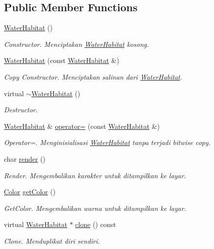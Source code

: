 \subsection*{Public Member Functions}
\begin{DoxyCompactItemize}
\item 
\hyperlink{classWaterHabitat_a57a0d15fae5e17531835be2284df0fd1}{Water\+Habitat} ()
\begin{DoxyCompactList}\small\item\em Constructor. Menciptakan \hyperlink{classWaterHabitat}{Water\+Habitat} kosong. \end{DoxyCompactList}\item 
\hyperlink{classWaterHabitat_aec1ce01fc4e2f220bb70192e7708841e}{Water\+Habitat} (const \hyperlink{classWaterHabitat}{Water\+Habitat} \&)
\begin{DoxyCompactList}\small\item\em Copy Constructor. Menciptakan salinan dari \hyperlink{classWaterHabitat}{Water\+Habitat}. \end{DoxyCompactList}\item 
virtual \hyperlink{classWaterHabitat_abf6341b18b2fe62110998db3ffbde4b7}{$\sim$\+Water\+Habitat} ()
\begin{DoxyCompactList}\small\item\em Destructor. \end{DoxyCompactList}\item 
\hyperlink{classWaterHabitat}{Water\+Habitat} \& \hyperlink{classWaterHabitat_aa46af1e045fde91fd7cbcb5ba6ad1ed1}{operator=} (const \hyperlink{classWaterHabitat}{Water\+Habitat} \&)
\begin{DoxyCompactList}\small\item\em Operator=. Menginisialisasi \hyperlink{classWaterHabitat}{Water\+Habitat} tanpa terjadi bitwise copy. \end{DoxyCompactList}\item 
char \hyperlink{classWaterHabitat_a3b8c80fc2e2ea0ec9a0f3ea8a7304b58}{render} ()
\begin{DoxyCompactList}\small\item\em Render. Mengembalikan karakter untuk ditampilkan ke layar. \end{DoxyCompactList}\item 
\hyperlink{color_8h_ab87bacfdad76e61b9412d7124be44c1c}{Color} \hyperlink{classWaterHabitat_a92b62eaa5bad358ed74c89cbbe64f96c}{get\+Color} ()
\begin{DoxyCompactList}\small\item\em Get\+Color. Mengembalikan warna untuk ditampilkan ke layar. \end{DoxyCompactList}\item 
virtual \hyperlink{classWaterHabitat}{Water\+Habitat} $\ast$ \hyperlink{classWaterHabitat_ab55d7a09373090cfafac504bc1431878}{clone} () const 
\begin{DoxyCompactList}\small\item\em Clone. Menduplikat diri sendiri. \end{DoxyCompactList}\end{DoxyCompactItemize}
